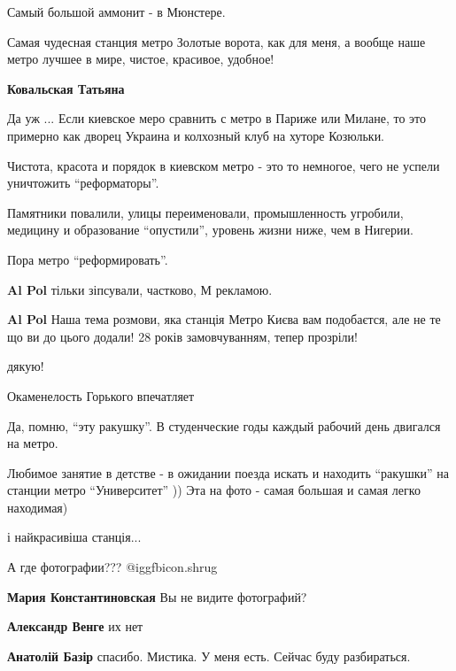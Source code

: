 \begin{itemize}
Самый большой аммонит - в Мюнстере.

Самая чудесная станция метро Золотые ворота, как для меня, а вообще наше метро лучшее в мире, чистое, красивое, удобное!

\begin{itemize} %
\textbf{Ковальская Татьяна} 

Да уж ... Если киевское меро сравнить с метро в Париже или Милане, то это
примерно как дворец Украина и колхозный клуб на хуторе Козюльки.

Чистота, красота и порядок в киевском метро - это то немногое, чего не успели
уничтожить \enquote{реформаторы}.

Памятники повалили, улицы переименовали, промышленность угробили, медицину и
образование \enquote{опустили}, уровень жизни ниже, чем в Нигерии.

Пора метро \enquote{реформировать}.

\textbf{Al Pol} тільки зіпсували, частково, М рекламою.

\textbf{Al Pol} Наша тема розмови, яка станція Метро Києва вам подобаєтся, але не те що ви до цього додали! 28 років замовчуванням, тепер прозріли!
\end{itemize} %

дякую!

Окаменелость Горького впечатляет

Да, помню, \enquote{эту ракушку}. В студенческие годы каждый рабочий день двигался на метро.


Любимое занятие в детстве - в ожидании поезда искать и находить \enquote{ракушки} на
станции метро \enquote{Университет} )) Эта на фото - самая большая и самая легко
находимая)


і найкрасивіша станція...

А где фотографии??? @igg{fbicon.shrug} 

\begin{itemize} %
\textbf{Мария Константиновская} Вы не видите фотографий?

\textbf{Александр Венге} их нет

\textbf{Анатолій Базір} спасибо. Мистика. У меня есть. Сейчас буду разбираться.


\end{itemize}
\end{itemize}
